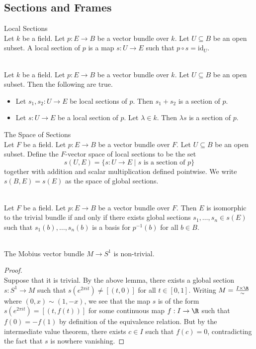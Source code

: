 \documentclass[a4paper]{article}
\begin{document}
\subsection{Sections and Frames}
\begin{defn}{Local Sections}{}\\
Let $k$ be a field. Let $p:E\to B$ be a vector bundle over $k$. Let $U\subseteq B$ be an open subset. A local section of $p$ is a map $s:U\to E$ such that $p\circ s=\text{id}_U$. 
\end{defn}

\begin{lmm}{}{}\\
Let $k$ be a field. Let $p:E\to B$ be a vector bundle over $k$. Let $U\subseteq B$ be an open subset. Then the following are true. 
\begin{itemize}
\item Let $s_1,s_2:U\to E$ be local sections of $p$. Then $s_1+s_2$ is a section of $p$. 
\item Let $s:U\to E$ be a local section of $p$. Let $\lambda\in k$. Then $\lambda s$ is a section of $p$. 
\end{itemize}
\end{lmm}

\begin{defn}{The Space of Sections}{}\\
Let $F$ be a field. Let $p:E\to B$ be a vector bundle over $F$. Let $U\subseteq B$ be an open subset. Define the $F$-vector space of local sections to be the set $$s(U,E)=\{s:U\to E\;|\;s\text{ is a section of }p\}$$ together with addition and scalar multiplication defined pointwise. We write $s(B,E)=s(E)$ as the space of global sections. 
\end{defn}

\begin{lmm}{}{}\\
Let $F$ be a field. Let $p:E\to B$ be a vector bundle over $F$. Then $E$ is isomorphic to the trivial bundle if and only if there exists global sections $s_1,\dots,s_n\in s(E)$ such that $s_1(b),\dots,s_n(b)$ is a basis for $p^{-1}(b)$ for all $b\in B$. 
\end{lmm}

\begin{eg}{}{}\\
The Mobius vector bundle $M\to S^1$ is non-trivial. 
\begin{proof}\\
Suppose that it is trivial. By the above lemma, there exists a global section $s:S^1\to M$ such that $s(e^{2\pi it})\neq[(t,0)]$ for all $t\in[0,1]$. Writing $M=\frac{I\times\R}{\sim}$ where $(0,x)\sim(1,-x)$, we see that the map $s$ is of the form $s(e^{2\pi it})=[(t,f(t))]$ for some continuous map $f:I\to\R$ such that $f(0)=-f(1)$ by definition of the equivalence relation. But by the intermediate value theorem, there exists $c\in I$ such that $f(c)=0$, contradicting the fact that $s$ is nowhere vanishing. 
\end{proof}
\end{eg}
\end{document}
